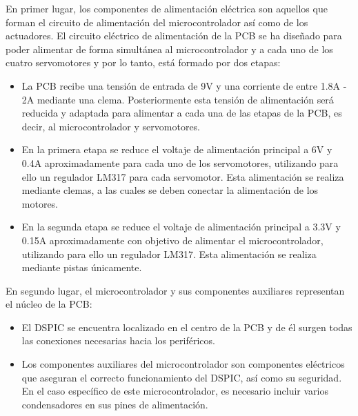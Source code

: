 En primer lugar, los componentes de alimentación eléctrica son aquellos que forman el circuito de alimentación del microcontrolador así como de los actuadores. El circuito eléctrico de alimentación de la PCB se ha diseñado para poder alimentar de forma simultánea al microcontrolador y a cada uno de los cuatro servomotores y por lo tanto, está formado por dos etapas:
\begin{itemize}
    \item La PCB recibe una tensión de entrada de 9V y una corriente de entre 1.8A - 2A mediante una clema. Posteriormente esta tensión de alimentación será reducida y adaptada para alimentar a cada una de las etapas de la PCB, es decir, al microcontrolador y servomotores.
    \item En la primera etapa se reduce el voltaje de alimentación principal a 6V y 0.4A aproximadamente para cada uno de los servomotores, utilizando para ello un regulador LM317 para cada servomotor. Esta alimentación se realiza mediante clemas, a las cuales se deben conectar la alimentación de los motores.
    \item En la segunda etapa se reduce el voltaje de alimentación principal a 3.3V y 0.15A aproximadamente con objetivo de alimentar el microcontrolador, utilizando para  ello un regulador LM317. Esta alimentación se realiza mediante pistas únicamente.
\end{itemize}

En segundo lugar, el microcontrolador y sus componentes auxiliares representan el núcleo de la PCB:
\begin{itemize}
    \item El DSPIC se encuentra localizado en el centro de la PCB y de él surgen todas las conexiones necesarias hacia los periféricos.
    \item Los componentes auxiliares del microcontrolador son componentes eléctricos que aseguran el correcto funcionamiento del DSPIC, así como su seguridad. En el caso específico de este microcontrolador, es necesario incluir varios condensadores en sus pines de alimentación.
\end{itemize}

